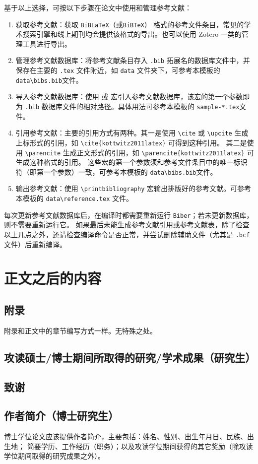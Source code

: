 基于以上选择，可按以下步骤在论文中使用和管理参考文献：
\begin{enumerate}
    \item 获取参考文献：获取 \verb|BiBLaTeX|（或\verb|BiBTeX|） 格式的参考文件条目，常见的学术搜索引擎和线上期刊均会提供该格式的导出。也可以使用 Zotero 一类的管理工具进行导出。
    \item 管理参考文献数据库：将参考文献条目存入 \verb|.bib| 拓展名的数据库文件中，并保存在主要的 \verb|.tex| 文件附近，如 \verb|data| 文件夹下，可参考本模板的 \verb|data\bibs.bib|文件。
    \item 导入参考文献数据库：使用 \verb|| 或 \verb|| 宏引入参考文献数据库，该宏的第一个参数即为 \verb|.bib| 数据库文件的相对路径。具体用法可参考本模板的 \verb|sample-*.tex|文件。
    \item 引用参考文献：主要的引用方式有两种。其一是使用 \verb|\cite| 或 \verb|\upcite| 生成上标形式的引用，如 \verb|\cite{kottwitz2011latex}| 可得到这种\cite{kottwitz2011latex}引用。
        其二是使用 \verb|\parencite| 生成正文形式的引用，如 \verb|\parencite{kottwitz2011latex}| 可生成这种\parencite{kottwitz2011latex}格式的引用。
        这些宏的第一个参数须和参考文件条目中的唯一标识符（即第一个参数）一致，可参考本模板的 \verb|data\bibs.bib|文件。
    \item 输出参考文献：使用 \verb|\printbibliography| 宏输出排版好的参考文献。可参考本模板的 \verb|data\reference.tex| 文件。
\end{enumerate}

每次更新参考文献数据库后，在编译时都需要重新运行 \verb|Biber|；若未更新数据库，则不需要重新运行它。
如果最后未能生成参考文献引用或参考文献表，除了检查以上几点之外，还请检查编译命令是否正常，并尝试删除辅助文件（尤其是 \verb|.bcf| 文件）后重新编译。

\section{正文之后的内容}
\subsection{附录}
附录和正文中的章节编写方式一样。无特殊之处。
\subsection{攻读硕士\slash 博士期间所取得的研究\slash 学术成果（研究生）}
\subsection{致谢}
\subsection{作者简介（博士研究生）}
博士学位论文应该提供作者简介，主要包括：姓名、性别、出生年月日、民族、出生地；
简要学历、工作经历（职务）；以及攻读学位期间获得的其它奖励（除攻读学位期间取得的研究成果之外）。
